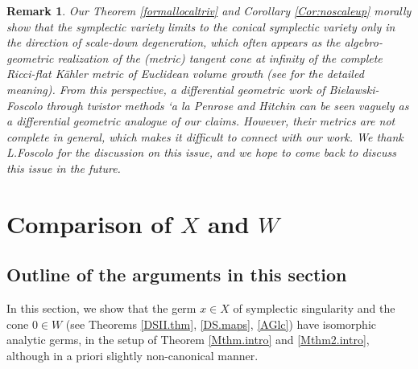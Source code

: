 \documentclass[12pt,a4paper]{amsart}
\newtheorem{Rem}[Thm]{Remark}
\theoremstyle{remark}
\theoremstyle{definition}
\begin{document}
\begin{Rem}
Our Theorem \ref{formallocaltriv} and Corollary \ref{Cor:noscaleup} morally show that the symplectic variety limits to the 
conical symplectic variety only in the direction of scale-down degeneration, which often appears as the algebro-geometric realization of the (metric)
tangent cone {\it at infinity} of the complete Ricci-flat K\"ahler metric
of Euclidean volume growth (see \cite{CH, SZ, Od24b, Od24c} for the detailed meaning). 
From this perspective, a differential geometric work of Bielawski-Foscolo \cite{BF} through twistor methods `a la Penrose and Hitchin
can be seen vaguely as a differential geometric analogue of our
claims. 
However, their metrics are 
not complete in general, which makes it difficult to connect with our 
work. 
We thank L.Foscolo for the discussion on this issue, and we 
hope to come back to discuss this issue in the future. 
\end{Rem}





\section{Comparison of $X$ and $W$}\label{sec:XW}

\subsection{Outline of the arguments in this section}
In this section, 
we show that the germ $x\in X$ of symplectic singularity and the cone $0\in W$ 
(see Theorems \ref{DSII.thm}, \ref{DS.maps}, \ref{AGlc}) 
have isomorphic 
analytic germs,  
in the setup of Theorem \ref{Mthm.intro} and \ref{Mthm2.intro}, although in a priori slightly non-canonical manner.
\end{document}
